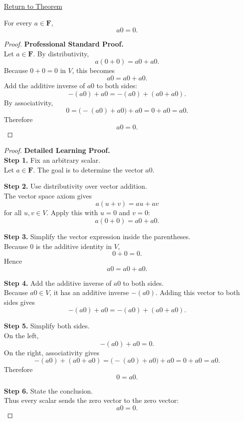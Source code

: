 
\newpage
{}
\label{prf:scalar-times-zero-vector}

\begin{remark*}[Return]
\hyperref[thm:scalar-times-zero-vector]{Return to Theorem}
\end{remark*}

\begin{theorem*}[$a0=0$]
For every $a \in \mathbf{F}$,
\[
a0=0.
\]
\end{theorem*}

\begin{proof}
\textbf{Professional Standard Proof.}~\\
Let $a \in \mathbf{F}$. By distributivity,
\[
a(0+0)=a0+a0.
\]
Because $0+0=0$ in $V$, this becomes
\[
a0=a0+a0.
\]
Add the additive inverse of $a0$ to both sides:
\[
-(a0)+a0=-(a0)+(a0+a0).
\]
By associativity,
\[
0=\bigl(-(a0)+a0\bigr)+a0=0+a0=a0.
\]
Therefore
\[
a0=0.
\]
\end{proof}

\begin{proof}
\textbf{Detailed Learning Proof.}~\\

\textbf{Step 1.} Fix an arbitrary scalar.\\
Let $a \in \mathbf{F}$. The goal is to determine the vector $a0$.

\textbf{Step 2.} Use distributivity over vector addition.\\
The vector space axiom gives
\[
a(u+v)=au+av
\]
for all $u,v \in V$. Apply this with $u=0$ and $v=0$:
\[
a(0+0)=a0+a0.
\]

\textbf{Step 3.} Simplify the vector expression inside the parentheses.\\
Because $0$ is the additive identity in $V$,
\[
0+0=0.
\]
Hence
\[
a0=a0+a0.
\]

\textbf{Step 4.} Add the additive inverse of $a0$ to both sides.\\
Because $a0 \in V$, it has an additive inverse $-(a0)$. Adding this vector to both sides gives
\[
-(a0)+a0=-(a0)+(a0+a0).
\]

\textbf{Step 5.} Simplify both sides.\\
On the left,
\[
-(a0)+a0=0.
\]
On the right, associativity gives
\[
-(a0)+(a0+a0)=\bigl(-(a0)+a0\bigr)+a0=0+a0=a0.
\]
Therefore
\[
0=a0.
\]

\textbf{Step 6.} State the conclusion.\\
Thus every scalar sends the zero vector to the zero vector:
\[
a0=0.
\]
\end{proof}


